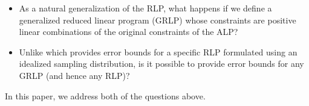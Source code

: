 \begin{itemize}
\item  As a natural generalization of the RLP, what happens if we define a generalized reduced linear program (GRLP) whose constraints are positive linear combinations of the original constraints of the ALP?
\item Unlike \cite{CS} which provides error bounds for a specific RLP formulated using an idealized sampling distribution, is it possible to provide error bounds for any GRLP (and hence any RLP)?
\end{itemize}
In this paper, we address both of the questions above.
